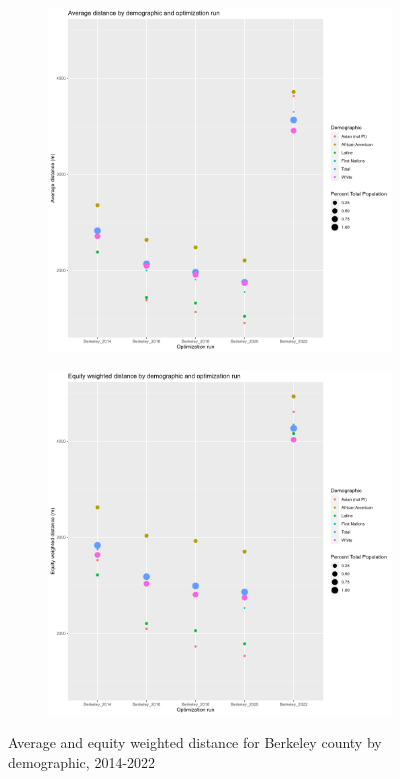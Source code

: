 \documentclass[11pt]{article}
\theoremstyle{remark}
\theoremstyle{definition}
\begin{document}
\begin{figure}
	\begin{subfigure}{.8\textwidth}
		\centering
		\includegraphics[width=.8\linewidth]{result analysis/Berkeley_SC_original_configs/orig_pop_scaled_avg}
		\label{sfig:Berkeley avg dist}
	\end{subfigure} \newline
	\begin{subfigure}{.8\textwidth}
		\centering
		\includegraphics[width=.8\linewidth]{result analysis/Berkeley_SC_original_configs/orig_pop_scaled_y_EDE}
		\label{sfig:Berkeley equity dist}
	\end{subfigure}
	\caption{Average and equity weighted distance for Berkeley county by demographic, 2014-2022}
	\label{fig:Berkeley distance graphs}
\end{figure}
\end{document}
